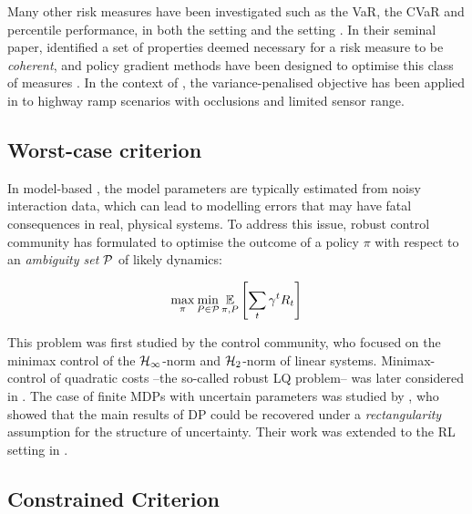 Many other risk measures have been investigated such as the \gls{VaR}, the \gls{CVaR} and percentile performance, in both the  setting \citet{Torossian19a} and the  setting \citep{Moody2001,Tamar2012,Prashanth2013,Delage2010}. In their seminal paper, \citet{Artzner1999} identified a set of properties deemed necessary for a risk measure to be \emph{coherent}, and policy gradient methods have been designed to optimise this class of measures \citep{Tamar2015}.
In the context of , the variance-penalised objective has been applied in \eg \citep{Naghshvar2018} to highway ramp scenarios with occlusions and limited sensor range.

\subsection{Worst-case criterion}

In model-based , the model parameters are typically estimated from noisy interaction data, which can lead to modelling errors that may have fatal consequences in real, physical systems. To address this issue, robust control community has formulated to optimise the outcome of a policy $\pi$ with respect to an \emph{ambiguity set} $\mathcal{P}$ of likely dynamics:

\begin{equation*}
\max_\pi \min_{P\in\mathcal{P}} \operatorname*{\mathbb{E}}_{\pi, P} \left[\sum_t \gamma^t R_t\right]
\end{equation*}

This problem was first studied by the control community, who focused on the minimax control of the $\mathcal{H}_\infty$-norm \citep[][]{Basar1996} and $\mathcal{H}_2$-norm \citep{Berkenkamp2015} of linear systems. Minimax-control of quadratic costs --the so-called robust \gls{LQ} problem-- was later considered in \citep{abbasi-yadkori11a,Ibrahimi2013,Faradonbeh2017,Ouyang2017,abeille18a,Dean2017,Dean2018}.
The case of finite \acp*{MDP} with uncertain parameters was studied by \citet{Iyengar2005,Nilim2005,Wiesemann2013}, who showed that the main results of \gls{DP} could be recovered under a \emph{rectangularity} assumption for the structure of uncertainty. Their work was extended to the \gls{RL} setting in \citep{Tamar2014}.


\subsection{Constrained Criterion}
\label{sec:constrained-criterion}

